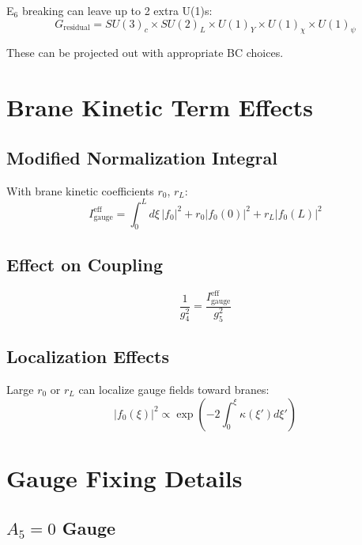 \documentclass[11pt,a4paper]{article}
\begin{document}
E$_6$ breaking can leave up to 2 extra U(1)s:
\begin{equation}
  G_{\text{residual}} = SU(3)_c \times SU(2)_L \times U(1)_Y \times U(1)_\chi \times U(1)_\psi
  \label{eq:app-e6-residual}
\end{equation}

These can be projected out with appropriate BC choices.

\section{Brane Kinetic Term Effects}
\label{app:brane-kinetic}

\subsection{Modified Normalization Integral}

With brane kinetic coefficients $r_0$, $r_L$:
\begin{equation}
  I_{\text{gauge}}^{\text{eff}} = \int_0^L d\xi\, |f_0|^2
    + r_0 |f_0(0)|^2 + r_L |f_0(L)|^2
  \label{eq:app-igauge-brane}
\end{equation}

\subsection{Effect on Coupling}

\begin{equation}
  \frac{1}{g_4^2} = \frac{I_{\text{gauge}}^{\text{eff}}}{g_5^2}
  \label{eq:app-coupling-brane}
\end{equation}

\subsection{Localization Effects}

Large $r_0$ or $r_L$ can localize gauge fields toward branes:
\begin{equation}
  |f_0(\xi)|^2 \propto \exp\left(-2\int_0^\xi \kappa(\xi') d\xi'\right)
  \label{eq:app-localization}
\end{equation}

\section{Gauge Fixing Details}
\label{app:gauge-fixing}

\subsection{$A_5 = 0$ Gauge}
\end{document}
